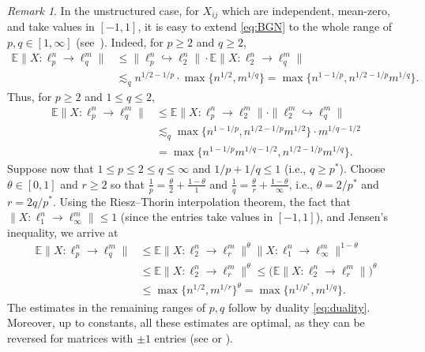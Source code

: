 \documentclass[a4paper]{amsart}
\theoremstyle{definition}
\theoremstyle{remark}
\newtheorem{remark}[theorem]{Remark}
\numberwithin{equation}{section}
\newcommand*{\EE}{\mathbb{E}}
\begin{document}
\begin{remark}
	\label{rem:BGN-extended-for-all-p,q}
	In the unstructured case, for $X_{ij}$ which are independent, mean-zero,  and take values in $[-1,1]$, it is easy to extend \eqref{eq:BGN} to the whole range of $p, q\in [1,\infty]$ (see~\cite{Bennett,CarlMaureyPuhl}).
	Indeed, for $p\geq 2$ and $q\geq 2$,
	\begin{align*}
	\EE \| X\colon \ell^n_p \to \ell^m_q\|
	&\leq
	\| \ell^n_p \hookrightarrow \ell^n_{2}\| \cdot	\EE \| X\colon \ell^n_2 \to \ell^m_q\| \\
	&\lesssim_q n^{1/2-1/p} \cdot \max\{n^{1/2}, m^{1/q}\}
	=      \max\{n^{1-1/p}, n^{1/2-1/p}m^{1/q}\} .
	\end{align*}
	Thus, for $p\geq 2$ and $1\leq q\leq 2$,
	\begin{align*}
	\EE \| X\colon \ell^n_p \to \ell^m_q\|
	&\leq
	\EE \| X\colon \ell^n_p \to \ell^m_2\| \cdot
	\| \ell^m_{2} \hookrightarrow \ell^m_q\| \\
	&\lesssim_q  \max\{n^{1-1/p}, n^{1/2-1/p}m^{1/2}\} \cdot  m^{1/q- 1/2}\\
	&=	\max\{n^{1-1/p}m^{1/q-1/2}, n^{1/2-1/p}m^{1/q}\}.
	\end{align*}
	Suppose now that $1\leq p \leq 2\leq q \leq \infty$ and $1/p+1/q\leq 1$ (i.e., $q\geq p^*$).
	Choose $\theta\in[0,1]$ and $r \geq 2$ so that $\frac{1}{p} = \frac{\theta}{2} + \frac{1-\theta}{1}$ and $\frac{1}{q} = \frac{\theta}{r} +  \frac{1-\theta}{\infty}$,
	i.e., $\theta = 2/p^*$ and $r = 2q/p^*$.
	Using the Riesz--Thorin interpolation theorem,
	 the fact that $\| X\colon \ell^n_1 \to \ell^m_\infty\|\leq 1$  (since the entries take values in $[-1,1]$), 
	 and Jensen's inequality, we arrive at
	\begin{align*}
	\EE \| X\colon \ell^n_p \to \ell^m_q\|
	&\leq
	\EE \| X\colon \ell^n_2 \to \ell^m_r\|^\theta \| X\colon \ell^n_1 \to \ell^m_\infty\|^{1-\theta}\\
	&\leq  \EE \| X\colon \ell^n_2 \to \ell^m_r\|^\theta \leq  \bigl(\EE \| X\colon \ell^n_2 \to \ell^m_r\|\bigr)^\theta \\
	&\leq \max\{n^{1/2}, m^{1/r}\}^{\theta} =  \max\{n^{1/p^*}, m^{1/q}\}.
	\end{align*}
	The estimates in the remaining ranges of $p, q$ follow by duality \eqref{eq:duality}.
	Moreover, up to constants, all these estimates are optimal, as they can be reversed for matrices with $\pm 1$ entries (see \cite[Proposition~3.2]{Bennett} or \cite[Satz~2]{CarlMaureyPuhl}).
\end{remark}
\end{document}
